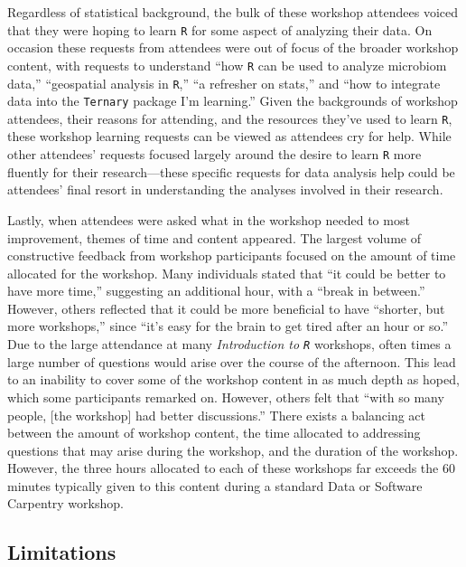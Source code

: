 \documentclass[12pt]{article}
\begin{document}
Regardless of statistical background, the bulk of these workshop attendees
voiced that they were hoping to learn \texttt{R} for some aspect of analyzing
their data. On occasion these requests from attendees were out of focus of the broader workshop content, with requests to understand ``how \texttt{R} can be used to analyze microbiom data,'' ``geospatial analysis in \texttt{R},'' ``a refresher on stats,'' and ``how to integrate data into the \texttt{Ternary} package I'm learning.'' Given the backgrounds of workshop attendees, their reasons for attending, and the resources they've used to learn \texttt{R}, these workshop learning requests can be viewed as attendees cry for help. While other attendees' requests focused largely around the desire to learn \texttt{R} more fluently for their research---these specific requests for data analysis help could be attendees' final resort in understanding the analyses involved in their research.  


\quad Lastly, when attendees were asked what in the workshop needed to most
improvement, themes of time and content appeared. The largest volume of
constructive feedback from workshop participants focused on the amount of time
allocated for the workshop. Many individuals stated that ``it could be better to
have more time,'' suggesting an additional hour, with a ``break in between.'' 
However, others reflected that it could be more beneficial to have ``shorter,
but more workshops,'' since ``it's easy for the brain to get tired after an hour
or so.'' Due to the large attendance at many \emph{Introduction to \texttt{R}}
workshops, often times a large number of questions would arise over the course
of the afternoon. This lead to an inability to cover some of the workshop content in as much depth as hoped, which some participants remarked on. However, others felt that ``with so many people, [the workshop] had better discussions.'' There exists a balancing act between the amount of workshop content, the time allocated to addressing questions that may arise during the workshop, and the duration of the workshop. However, the three hours allocated to each of these workshops far exceeds the 60 minutes typically given to this content during a standard Data or Software Carpentry workshop. 

\subsection{Limitations} 
\end{document}
